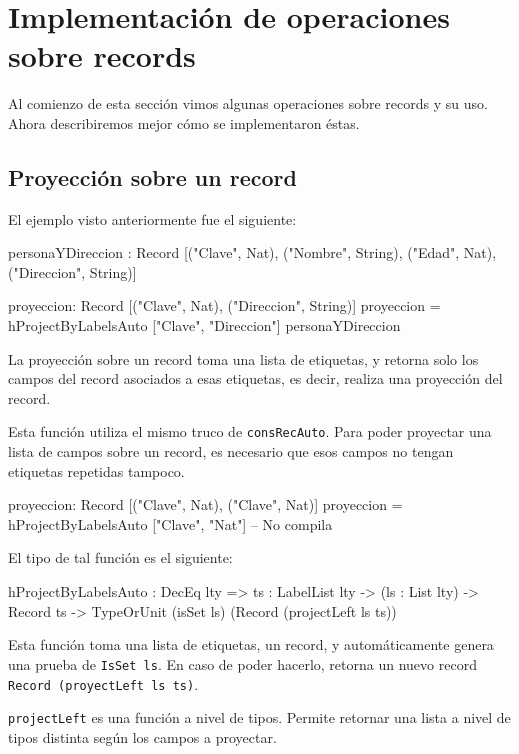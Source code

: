 \section{Implementación de operaciones sobre records}

Al comienzo de esta sección vimos algunas operaciones sobre records y su uso. Ahora describiremos mejor cómo se implementaron éstas.

\subsection{Proyección sobre un record}

El ejemplo visto anteriormente fue el siguiente:

\begin{code}
personaYDireccion : Record [("Clave", Nat), ("Nombre", String), 
  ("Edad", Nat), ("Direccion", String)]

proyeccion: Record [("Clave", Nat), ("Direccion", String)]
proyeccion = hProjectByLabelsAuto ["Clave", "Direccion"] 
  personaYDireccion
\end{code}

La proyección sobre un record toma una lista de etiquetas, y retorna solo los campos del record asociados a esas etiquetas, es decir, realiza una proyección del record.

Esta función utiliza el mismo truco de \texttt{consRecAuto}. Para poder proyectar una lista de campos sobre un record, es necesario que esos campos no tengan etiquetas repetidas tampoco.

\begin{code}
proyeccion: Record [("Clave", Nat), ("Clave", Nat)]
proyeccion = hProjectByLabelsAuto ["Clave", "Nat"]
-- No compila 
\end{code}

El tipo de tal función es el siguiente:

\begin{code}
hProjectByLabelsAuto : DecEq lty => {ts : LabelList lty} -> 
  (ls : List lty) -> Record ts -> 
  TypeOrUnit (isSet ls) (Record (projectLeft ls ts))
\end{code}

Esta función toma una lista de etiquetas, un record, y automáticamente genera una prueba de \texttt{IsSet ls}. En caso de poder hacerlo, retorna un nuevo record \texttt{Record (proyectLeft ls ts)}.

\texttt{projectLeft} es una función a nivel de tipos. Permite retornar una lista a nivel de tipos distinta según los campos a proyectar.

